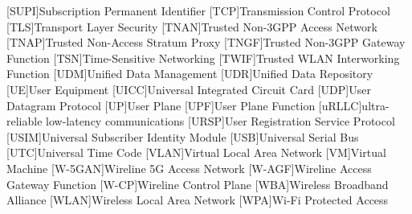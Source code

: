 \begin{multicols}{2}
\begin{acronym}[WPA]
        [SUPI]{Subscription Permanent Identifier}
        [TCP]{Transmission Control Protocol}
        [TLS]{Transport Layer Security}
        [TNAN]{Trusted Non-3GPP Access Network}
        [TNAP]{Trusted Non-Access Stratum Proxy}
        [TNGF]{Trusted Non-3GPP Gateway Function}
        [TSN]{Time-Sensitive Networking}
        [TWIF]{Trusted WLAN Interworking Function}
        [UDM]{Unified Data Management}
        [UDR]{Unified Data Repository}
        [UE]{User Equipment}
        [UICC]{Universal Integrated Circuit Card}
        [UDP]{User Datagram Protocol}
        [UP]{User Plane}
        [UPF]{User Plane Function}
        [uRLLC]{ultra-reliable low-latency communications}
        [URSP]{User Registration Service Protocol}
        [USIM]{Universal Subscriber Identity Module}
        [USB]{Universal Serial Bus}
        [UTC]{Universal Time Code}
        [VLAN]{Virtual Local Area Network}
        [VM]{Virtual Machine}
        [W-5GAN]{Wireline 5G Access Network}
        [W-AGF]{Wireline Access Gateway Function}
        [W-CP]{Wireline Control Plane}
        [WBA]{Wireless Broadband Alliance}
        [WLAN]{Wireless Local Area Network}
        [WPA]{Wi-Fi Protected Access}
    \end{acronym}
\end{multicols}
